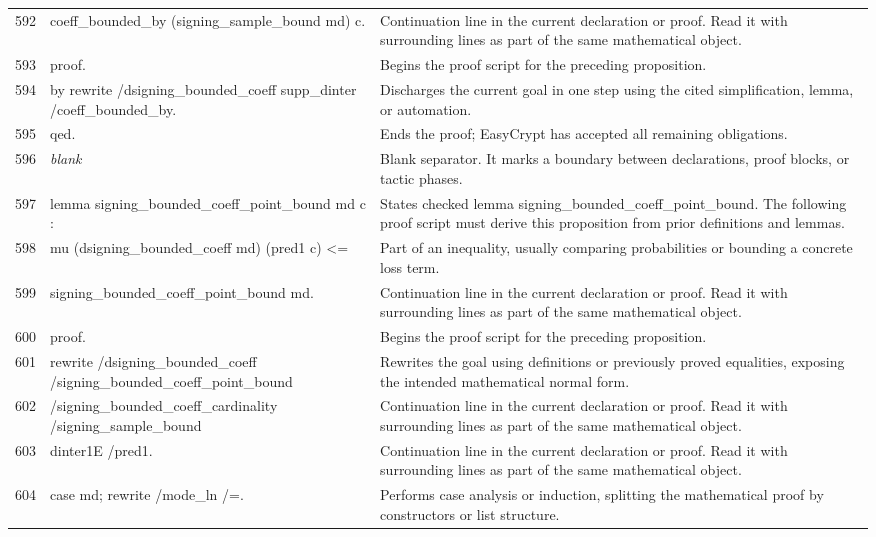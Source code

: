 \documentclass[10pt]{article}
\begin{document}
\begin{longtable}{r L{0.53\textwidth} L{0.37\textwidth}}
592 & {\ttfamily\scriptsize   coeff\_bounded\_by (signing\_sample\_bound md) c.} & Continuation line in the current declaration or proof.  Read it with surrounding lines as part of the same mathematical object. \\
593 & {\ttfamily\scriptsize proof.} & Begins the proof script for the preceding proposition. \\
594 & {\ttfamily\scriptsize by rewrite /dsigning\_bounded\_coeff supp\_dinter /coeff\_bounded\_by.} & Discharges the current goal in one step using the cited simplification, lemma, or automation. \\
595 & {\ttfamily\scriptsize qed.} & Ends the proof; EasyCrypt has accepted all remaining obligations. \\
596 & {\ttfamily\scriptsize \emph{blank}} & Blank separator.  It marks a boundary between declarations, proof blocks, or tactic phases. \\
597 & {\ttfamily\scriptsize lemma signing\_bounded\_coeff\_point\_bound md c :} & States checked lemma signing\_bounded\_coeff\_point\_bound.  The following proof script must derive this proposition from prior definitions and lemmas. \\
598 & {\ttfamily\scriptsize   mu (dsigning\_bounded\_coeff md) (pred1 c) <=} & Part of an inequality, usually comparing probabilities or bounding a concrete loss term. \\
599 & {\ttfamily\scriptsize   signing\_bounded\_coeff\_point\_bound md.} & Continuation line in the current declaration or proof.  Read it with surrounding lines as part of the same mathematical object. \\
600 & {\ttfamily\scriptsize proof.} & Begins the proof script for the preceding proposition. \\
601 & {\ttfamily\scriptsize rewrite /dsigning\_bounded\_coeff /signing\_bounded\_coeff\_point\_bound} & Rewrites the goal using definitions or previously proved equalities, exposing the intended mathematical normal form. \\
602 & {\ttfamily\scriptsize         /signing\_bounded\_coeff\_cardinality /signing\_sample\_bound} & Continuation line in the current declaration or proof.  Read it with surrounding lines as part of the same mathematical object. \\
603 & {\ttfamily\scriptsize         dinter1E /pred1.} & Continuation line in the current declaration or proof.  Read it with surrounding lines as part of the same mathematical object. \\
604 & {\ttfamily\scriptsize case md; rewrite /mode\_ln /=.} & Performs case analysis or induction, splitting the mathematical proof by constructors or list structure. \\

\end{longtable}
\end{document}
